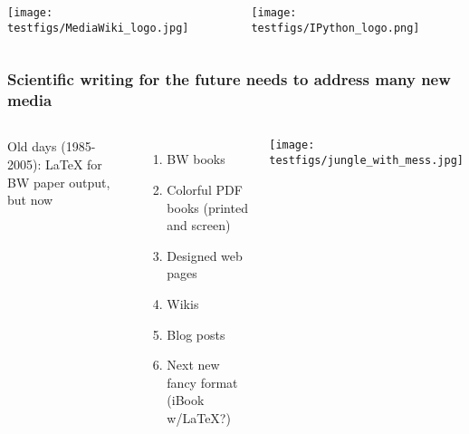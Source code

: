 \documentclass{beamer}
\begin{document}
\begin{frame}
\begin{columns}
\vspace{6mm}


\vspace{6mm}

\centerline{\texttt{[image: testfigs/MediaWiki\_logo.jpg]}}

\vspace{6mm}


\vspace{6mm}

\centerline{\texttt{[image: testfigs/IPython\_logo.png]}}

\vspace{6mm}


\end{columns}
\end{frame}

\begin{frame}
\frametitle{Scientific writing for the future needs to address many new media}


\begin{columns}
Old days (1985-2005): {\LaTeX} for BW paper output, but now

\begin{enumerate}
  \item BW books

  \item Colorful PDF books (printed and screen)

  \item Designed web pages

  \item Wikis

  \item Blog posts

  \item Next new fancy format (iBook w/LaTeX?)
\end{enumerate}

\noindent

\vspace{6mm}

\centerline{\texttt{[image: testfigs/jungle\_with\_mess.jpg]}}

\vspace{6mm}


\end{columns}
\end{frame}
\end{document}
